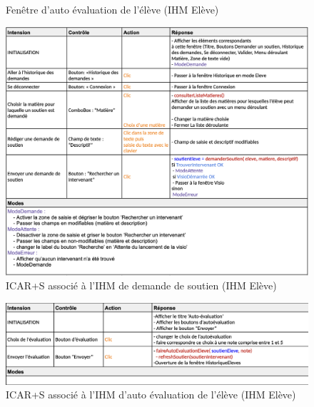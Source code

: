 \begin{figure}[H]
    \centering
    \caption{Fenêtre d'auto évaluation de l'élève (IHM Elève)}
\end{figure}

\begin{figure}[H]
    \centering
    \includegraphics[width=13cm]{ICARS/demandeEleve.png}
    \caption{ICAR+S associé à l'IHM de demande de soutien (IHM Elève)}
\end{figure}

\begin{figure}[H]
    \centering
    \includegraphics[width=13cm]{ICARS/autoeval.png}
    \caption{ICAR+S associé à l'IHM d'auto évaluation de l'élève (IHM Elève)}
\end{figure}


